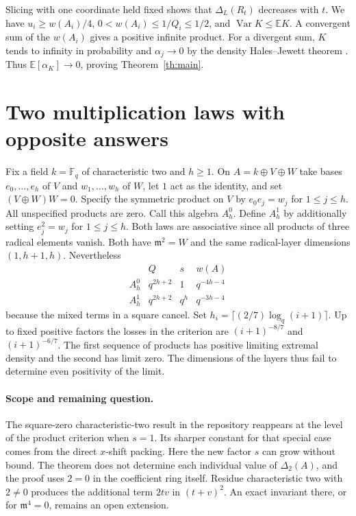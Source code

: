 \documentclass[11pt]{article}
\newcommand{\F}{\mathbb F}
\newcommand{\m}{\mathfrak m}
\begin{document}
Slicing with one coordinate held fixed shows that $\Delta_L(R_t)$ decreases with $t$. We have $u_i\ge w(A_i)/4$, $0<w(A_i)\le1/Q_i\le1/2$, and $\operatorname{Var}K\le\mathbb EK$. A convergent sum of the $w(A_i)$ gives a positive infinite product. For a divergent sum, $K$ tends to infinity in probability and $\alpha_j\to0$ by the density Hales--Jewett theorem \cite{dhj}. Thus $\mathbb E[\alpha_K]\to0$, proving Theorem~\ref{th:main}.

\section{Two multiplication laws with opposite answers}
Fix a field $k=\F_q$ of characteristic two and $h\ge1$. On $A=k\oplus V\oplus W$ take bases $e_0,\ldots,e_h$ of $V$ and $w_1,\ldots,w_h$ of $W$, let $1$ act as the identity, and set $(V\oplus W)W=0$. Specify the symmetric product on $V$ by $e_0e_j=w_j$ for $1\le j\le h$. All unspecified products are zero. Call this algebra $A_h^0$. Define $A_h^1$ by additionally setting $e_j^2=w_j$ for $1\le j\le h$. Both laws are associative since all products of three radical elements vanish. Both have $\m^2=W$ and the same radical-layer dimensions $(1,h+1,h)$. Nevertheless
\[
 \begin{array}{c|c|c|c}
  &Q&s&w(A)\\\hline
 A_h^0&q^{2h+2}&1&q^{-4h-4}\\
 A_h^1&q^{2h+2}&q^h&q^{-3h-4}
 \end{array}
\]
because the mixed terms in a square cancel. Set $h_i=\lceil(2/7)\log_q(i+1)\rceil$. Up to fixed positive factors the losses in the criterion are $(i+1)^{-8/7}$ and $(i+1)^{-6/7}$. The first sequence of products has positive limiting extremal density and the second has limit zero. The dimensions of the layers thus fail to determine even positivity of the limit.

\paragraph{Scope and remaining question.} The square-zero characteristic-two result in the repository reappears at the level of the product criterion when $s=1$. Its sharper constant for that special case comes from the direct $x$-shift packing. Here the new factor $s$ can grow without bound. The theorem does not determine each individual value of $\Delta_2(A)$, and the proof uses $2=0$ in the coefficient ring itself. Residue characteristic two with $2\ne0$ produces the additional term $2tv$ in $(t+v)^2$. An exact invariant there, or for $\m^4=0$, remains an open extension.
\end{document}
